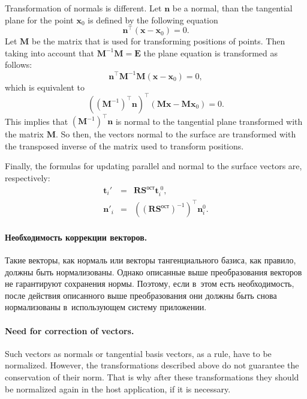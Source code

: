 \documentclass[a4paper, 12pt, titlepage]{extarticle}
\newcommand{\vect}[1]{\mathbf{#1}} %
\newcommand{\matx}[1]{\mathbf{#1}} %
\newcommand{\transposed}{\top} %
\begin{document}
        Transformation of normals is different. Let $\vect n$ be a normal, than the tangential plane
        for the point $\vect{x}_0$ is defined by the following equation
        \[
        \vect{n}^\transposed (\vect x - \vect{x}_0) = 0.
        \]
        Let $\matx M$ be the matrix that is used for transforming positions of points. Then taking
        into account that $\matx{M}^{-1} \matx{M} = \matx{E}$ the plane equation is transformed as
        follows:
        \[
          \vect{n}^\transposed \matx{M}^{-1} \matx{M} (\vect x - \vect{x}_0) = 0,
        \]
        which is equivalent to
        \[
           \left( (\matx{M}^{-1})^\transposed \vect{n} \right)^\transposed (\matx{M} \vect x - \matx{M} \vect{x}_0) = 0.
        \]
        This implies that $(\matx{M}^{-1})^\transposed \vect{n}$ is normal to the tangential plane
        transformed with the matrix $\matx M$. So then, the vectors normal to the surface are
        transformed with the transposed inverse of the matrix used to transform positions.

        Finally, the formulas for updating parallel and normal to the surface vectors are, respectively:
        \begin{eqnarray}
          \vect{t}_i\!' & = & \matx{R} \matx{S}^{ост} \vect{t}^{\;0}_i, \label{eq:tangent_vectors} \\
          \vect{n}'_i & = & \left(\left(\matx{R} \matx{S}^{ост}\right)^{-1}\right)^\transposed \vect{n}^0_i. \label{eq:normal_vectors}
        \end{eqnarray}

\begin{original}
        \paragraph{Необходимость коррекции векторов.}
        Такие векторы, как нормаль или векторы тангенциального базиса, как правило, должны быть
        нормализованы. Однако описанные выше преобразования векторов не гарантируют сохранения
        нормы. Поэтому, если в~этом есть необходимость, после действия описанного выше преобразования
        они должны быть снова нормализованы в~использующем систему приложении.
\end{original}

        \paragraph{Need for correction of vectors.}
        Such vectors as normals or tangential basis vectors, as a rule, have to be normalized.
        However, the transformations described above do not guarantee the conservation of their
        norm. That is why after these transformations they should be normalized again in the host
        application, if it is necessary.
\end{document}
